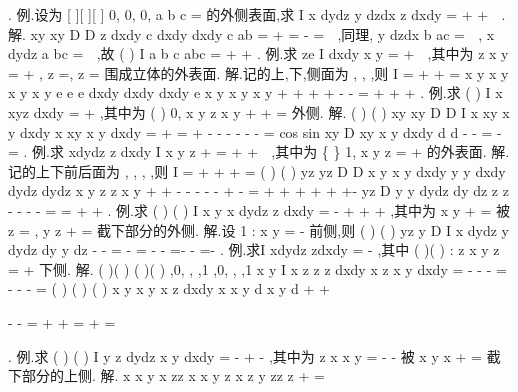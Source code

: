 \int \int 
. 
\textcolor{lyred}{例}.设\Sigma 为
[
][
][
]
0,
0,
0,
a
b
c
\Omega =
\times 
\times 
的外侧表面,求
I
x dydz
y dzdx
z dxdy
\Sigma 
=
+
+
\int \int 
. 
解.
xy
xy
D
D
z dxdy
c dxdy
dxdy
c ab
\Sigma 
\Sigma 
\Sigma 
=
+
=
-
=
\int \int 
\int \int 
\int \int 
\int \int 
\int \int 

,同理, 
y dzdx
b ac
\Sigma 
=
\int \int 
,
x dydz
a bc
\Sigma 
=
\int \int 
,故
(
)
I
a
b
c abc
=
+
+
. 
\textcolor{lyred}{例}.求
ze
I
dxdy
x
y
\Sigma 
=
+
\int \int 
,其中\Sigma 为
z
x
y
=
+
,
z =,
z =
围成立体的外表面. 
解.记\Sigma 的上,下,侧面为
\Sigma ,
\Sigma ,
\Sigma ,则
I
\Sigma 
\Sigma 
\Sigma 
=
+
+
=
\int \int 
\int \int 
\int \int 
x
y
x
y
x
y
x
y
e
e
e
dxdy
dxdy
dxdy
e
x
y
x
y
x
y
\pi 
+
+
\le 
+
\le 
\le 
+
\le 
-
-
=
+
+
+
\int \int 
\int \int 
\int \int 
. 
\textcolor{lyred}{例}.求
(
)
I
x
xyz dxdy
\Sigma 
=
+
\int \int 
,其中\Sigma 为
(
)
0,
x
y
z
x
y
+
+
=
\ge 
\ge 
外侧. 
解.
(
)
(
)
xy
xy
D
D
I
x
xy
x
y
dxdy
x
xy
x
y
dxdy
\Sigma 
\Sigma 
=
+
=
+
-
-
-
-
-
-
=
\int \int 
\int \int 
\int \int 
\int \int 
cos
sin
xy
D
xy
x
y dxdy
d
d
\pi 
\theta \rho 
\theta \rho 
\theta 
\rho 
\rho \rho 
-
-
=
\cdots 
\cdots 
-
\cdots 
=
\int \int 
\int 
\int 
. 
\textcolor{lyred}{例}.求
xdydz
z dxdy
I
x
y
z
\Sigma 
+
=
+
+
\int \int 
,其中\Sigma 为
\{
\}
1,
x
y
z
\Omega =
+
\le 
\le 
的外表面. 
解.记\Sigma 的上下前后面为
\Sigma ,
\Sigma ,
\Sigma ,
\Sigma ,则
I
\Sigma 
\Sigma 
\Sigma 
\Sigma 
=
+
+
+
=
\int \int 
\int \int 
\int \int 
\int \int 
(
)
(
)
yz
yz
D
D
x
y
x
y
dxdy
y
y
dxdy
dydz
dydz
x
y
z
z
x
y
+
\le 
+
\le 
-
-
-
-
\cdots 
-
+
-
=
+
+
+
+
+
+-
\int \int 
\int \int 
\int \int 
\int \int 
yz
D
y
y
dydz
dy
dz
z
z
\pi 
-
-
-
-
=
=
+
+
\int \int 
\int 
\int 
. 
\textcolor{lyred}{例}.求
(
)
(
)
I
x y
x
dydz
z
dxdy
\Sigma 
=
-
+
+
+
\int \int 
,其中\Sigma 为
x
y
+
=
被
z =
,
y
z
+
=
截下部分的外侧. 
解.设
1 :
x
y
\Sigma 
=
-
前侧,则 
(
)
(
)
yz
y
D
I
x dydz
y
dydz
dy
y dz
\pi 
-
\Sigma 
-
=
-
=
-
-
=-
-
=-
\int \int 
\int \int 
\int 
\int 
. 
\textcolor{lyred}{例}.求I
xdydz
zdxdy
\Sigma 
=
-
\int \int 
,其中
(
)(
)
:
z
x
y
z
\Sigma 
=
+
\le 
\le 
下侧. 
解.
(
)(
)
(
)(
)
,0,
,
,1
,0,
,
,1
x
y
I
x
z
z
z
dxdy
x
z
x
y
dxdy
\Sigma 
\Sigma 
=
-
\cdots -
-
=
-
\cdots -
-
=
\int \int 
\int \int 
(
)
(
)
(
)
x
y
x
y
x
z dxdy
x
x
y
d
x
y
d
\sigma 
\sigma 
\pi 
\Sigma 
+
\le 
+
\le 


-
-
=
+
+
=
+
=




\int \int 
\int \int 
\int \int 
. 
\textcolor{lyred}{例}.求
(
)
(
)
I
y
z dydz
x
y dxdy
\Sigma 
=
-
+
-
\int \int 
,其中\Sigma 为
z
x
x
y
=
-
-
被
x
y
x
+
=
截下部分的上侧. 
解.
x
x
y
x
zz
x
x
y
z
x
z
y
zz
z
+
=

